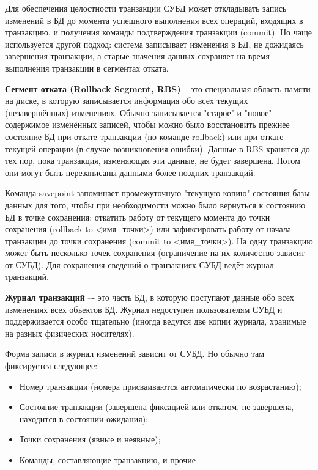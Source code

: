 Для обеспечения целостности транзакции СУБД может откладывать запись изменений в БД до момента успешного выполнения всех операций, входящих в транзакцию, и получения команды подтверждения транзакции (commit). Но чаще используется другой подход: система записывает изменения в БД, не дожидаясь завершения транзакции, а старые значения данных сохраняет на время выполнения транзакции в сегментах отката.

\textbf{Сегмент отката (Rollback Segment, RBS)} – это специальная область памяти на диске, в которую записывается информация обо всех текущих (незавершённых) изменениях. Обычно записывается "старое" и "новое" содержимое изменённых записей, чтобы можно было восстановить прежнее состояние БД при откате транзакции (по команде rollback) или при откате текущей операции (в случае возникновения ошибки). Данные в RBS хранятся до тех пор, пока транзакция, изменяющая эти данные, не будет завершена. Потом они могут быть перезаписаны данными более поздних транзакций.


Команда savepoint запоминает промежуточную "текущую копию" состояния базы данных для того, чтобы при необходимости можно было вернуться к состоянию БД в точке сохранения: откатить работу от текущего момента до точки сохранения (rollback to <имя\_точки>) или зафиксировать работу от начала транзакции до точки сохранения (commit to <имя\_точки>). На одну транзакцию может быть несколько точек сохранения (ограничение на их количество зависит от СУБД). Для сохранения сведений о транзакциях СУБД ведёт журнал транзакций. 

\textbf{Журнал транзакций} –- это часть БД, в которую поступают данные обо всех изменениях всех объектов БД. Журнал недоступен пользователям СУБД и поддерживается особо тщательно (иногда ведутся две копии журнала, хранимые на разных физических носителях). 

Форма записи в журнал изменений зависит от СУБД. Но обычно там фиксируется следующее:

\begin{itemize}
    \item Номер транзакции (номера присваиваются автоматически по возрастанию);
    \item Состояние транзакции (завершена фиксацией или откатом, не завершена, находится в состоянии ожидания);
    \item Точки сохранения (явные и неявные);
    \item Команды, составляющие транзакцию, и прочие
\end{itemize}

